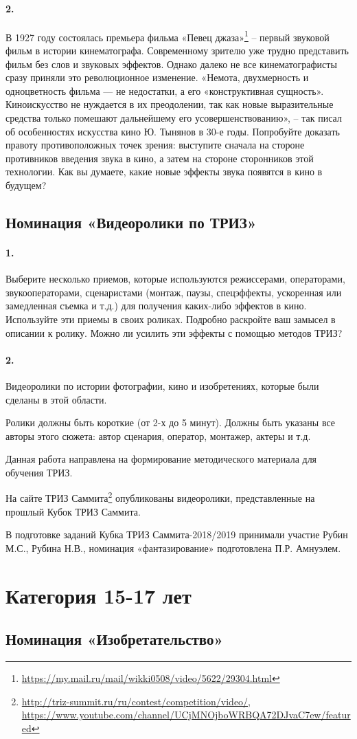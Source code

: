 \documentclass[11pt,a4paper]{article}
\newcommand{\video}{Ролики должны быть короткие (от 2-х до 5 минут). Должны
  быть указаны все авторы этого сюжета: автор сценария, оператор, монтажер,
  актеры и т.д.

Данная работа направлена на формирование методического материала для обучения
ТРИЗ.

На сайте ТРИЗ
Саммита\footnote{\url{http://triz-summit.ru/ru/contest/competition/video/},\\
  \url{https://www.youtube.com/channel/UCjMNOjboWRBQA72DJvaC7ew/featured}}
опубликованы видеоролики, представленные на прошлый Кубок ТРИЗ Саммита.}
\newcommand{\credentials}{В подготовке заданий Кубка ТРИЗ Саммита-2018/2019
  принимали участие Рубин М.С., Рубина Н.В., номинация «фантазирование»
  подготовлена П.Р. Амнуэлем.}
\begin{document}
\paragraph{2.}
В 1927 году состоялась премьера фильма «Певец
джаза»\footnote{\url{https://my.mail.ru/mail/wikki0508/video/5622/29304.html}}
-- первый звуковой фильм в истории кинематографа. Современному зрителю уже
трудно представить фильм без слов и звуковых эффектов. Однако далеко не все
кинематографисты сразу приняли это революционное изменение. «Немота,
двухмерность и одноцветность фильма — не недостатки, а его «конструктивная
сущность». Киноискусство не нуждается в их преодолении, так как новые
выразительные средства только помешают дальнейшему его усовершенствованию», --
так писал об особенностях искусства кино Ю. Тынянов в 30-е годы. Попробуйте
доказать правоту противоположных точек зрения: выступите сначала на стороне
противников введения звука в кино, а затем на стороне сторонников этой
технологии.  Как вы думаете, какие новые эффекты звука появятся в кино в
будущем?

\subsection*{Номинация «Видеоролики по ТРИЗ»}

\paragraph{1.}
Выберите несколько приемов, которые используются режиссерами, операторами,
звукооператорами, сценаристами (монтаж, паузы, спецэффекты, ускоренная или
замедленная съемка и т.д.) для получения каких-либо эффектов в кино.
Используйте эти приемы в своих роликах. Подробно раскройте ваш замысел в
описании к ролику. Можно ли усилить эти эффекты с помощью методов ТРИЗ?

\paragraph{2.}
Видеоролики по истории фотографии, кино и изобретениях, которые были сделаны в
этой области.

\video\par\credentials
\clearpage

\section*{Категория 15-17 лет}

\subsection*{Номинация «Изобретательство»}
\end{document}
